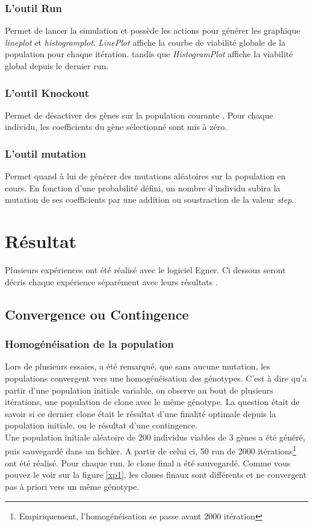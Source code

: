 \documentclass{article}
\begin{document}
	\subsubsection{ L'outil Run}
	Permet de lancer la simulation et possède les actions pour générer les graphique \emph{lineplot} et \emph{histogramplot}. \emph{LinePlot} affiche la courbe de viabilité globale de la population pour chaque itération. tandis que \emph{HistogramPlot} affiche la viabilité global depuis le dernier run. 
	\subsubsection{L'outil Knockout}
	Permet de désactiver des gènes sur la population courante . Pour chaque individu, les coefficients du gène sélectionné sont mis à zéro. 
	\subsubsection{L'outil mutation}
	Permet quand à lui de générer des mutations aléatoires sur la population en cours. En fonction d'une probabilité défini, un nombre d'individu subira la mutation de ses coefficients par une addition ou soustraction de la valeur \emph{step}.

	\section {Résultat}
	Plusieurs expériences ont été réalisé avec le logiciel Egner. Ci dessous seront décris chaque expérience séparément avec leurs résultats .

	\subsection{Convergence ou Contingence}
	\subsubsection{Homogénéisation de la population}
	Lors de plusieurs essaies, a été remarqué, que sans aucune mutation, les populations convergent vers une homogénéisation des génotypes. C'est à dire qu'a partir d'une population initiale variable, on observe au bout de plusieurs itérations, une population de clone avec le même génotype. La question était de savoir si ce dernier clone était le résultat d'une finalité optimale depuis la population initiale, ou le résultat d'une contingence. \\
	Une population initiale aléatoire de 200 individus viables de 3 gènes a été généré, puis sauvegardé dans un fichier. A partir de celui ci, 50 run de 2000 itérations\footnote{Empiriquement, l’homogénéisation se passe avant 2000 itération} ont été réalisé. Pour chaque run, le clone final a été sauvegardé. Comme vous pouvez le voir sur la figure \ref{xp1}, les clones finaux sont différents et ne convergent pas à priori vers un même génotype. 
\end{document}
